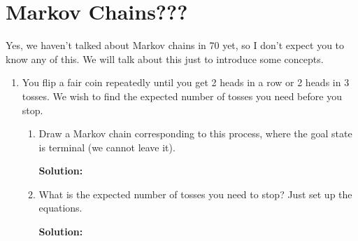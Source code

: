\documentclass{article}
\newenvironment{solution}{

            \color{blue} \smallskip \textbf{Solution:}}{}
\begin{document}
     \section{Markov Chains???}
     Yes, we haven't talked about Markov chains in 70 yet, so I don't expect you to know any of this. We will talk about this just to introduce some
     concepts.
     \begin{enumerate}
        \item You flip a fair coin repeatedly until you get 2 heads in a row or 2 heads in 3 tosses. We wish to find the expected number of tosses you need
        before you stop.
        \begin{enumerate}
            \item Draw a Markov chain corresponding to this process, where the goal state is terminal (we cannot leave it).
            \begin{solution}
            \end{solution}
            \item What is the expected number of tosses you need to stop? Just set up the equations.
            \begin{solution}
            \end{solution}
        \end{enumerate}
     \end{enumerate}
    
\end{document}
